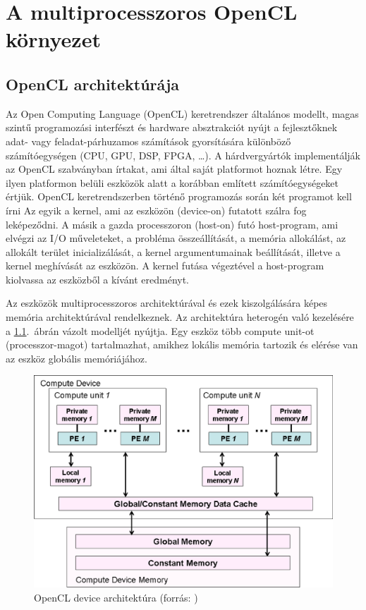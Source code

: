 \chapter{A multiprocesszoros OpenCL környezet} \label{sec:opencl}

\section{OpenCL architektúrája}
	Az Open Computing Language (OpenCL) keretrendszer \cite{opencl}
	általános modellt, magas szintű programozási interfészt és hardware
	absztrakciót nyújt a fejlesztőknek adat- vagy feladat-párhuzamos számítások gyorsítására különböző
	számítóegységen (CPU, GPU, DSP, FPGA, \ldots).
	A hárdvergyártók implementálják az OpenCL szabványban írtakat, ami által saját platformot
	hoznak létre. Egy ilyen platformon belüli eszközök alatt a korábban említett számítóegységeket értjük.
	OpenCL keretrendszerben történő programozás során két programot kell írni
	Az egyik a kernel, ami az eszközön (device-on) futatott szálra fog leképeződni.
	A másik a gazda processzoron (host-on) futó host-program, ami elvégzi az I/O műveleteket,
	a probléma összeállítását, a memória allokálást, az allokált terület inicializálását, a kernel argumentumainak beállítását,
	illetve a kernel meghívását az eszközön.
	A kernel futása végeztével a host-program kiolvassa az eszközből a kívánt eredményt.
	
	Az eszközök multiprocesszoros architektúrával és ezek kiszolgálására képes memória architektúrával rendelkeznek. 
	Az architektúra heterogén való kezelésére a \ref{fig:device}.~ábrán vázolt modelljét nyújtja.
	Egy eszköz több compute unit-ot (processzor-magot) tartalmazhat, amikhez lokális memória tartozik és elérése van az eszköz globális memóriájához.
	\newpage
	\begin{figure}[!t]
		\centering
		\includegraphics[width=0.6\columnwidth]{figures/eps/device.eps}
		\caption{OpenCL device architektúra (forrás: \cite{opencl})} 
		\label{fig:device} 
	\end{figure}
	
